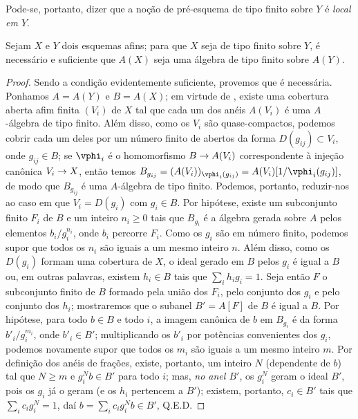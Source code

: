 \documentclass[oneside]{amsart}
\makeatletter
\renewcommand{\geq}{\geqslant}
\newcommand{\ega@arrow}[2]{\mathchoice{#1}{#2}{#2}{#2}}
\renewcommand{\to}{\ega@arrow{\longrightarrow}{\rightarrow}}
\newcommand{\oldpage}[2][]{{\marginnote{\normalfont\textbf{#1}~|~#2}}\ignorespaces}
\let\EGAOriginalLabel\label
\renewcommand{\label}[1]{\phantomsection\EGAOriginalLabel{#1}}
\makeatother
\begin{document}
\oldpage[I]{145}
Pode-se, portanto, dizer que a noção de pré-esquema de tipo finito sobre $Y$ é \emph{local em $Y$}.

\begin{proposition}[6.3.3]
\label{I.6.3.3}
Sejam $X$ e $Y$ dois esquemas afins;
para que $X$ seja de tipo finito sobre $Y$, é necessário e suficiente que $A(X)$ seja uma álgebra de tipo finito sobre $A(Y)$.
\end{proposition}

\begin{proof}
Sendo a condição evidentemente suficiente, provemos que é necessária.
Ponhamos $A=A(Y)$ e $B=A(X)$;
em virtude de , existe uma cobertura aberta afim finita $(V_i)$ de $X$ tal que cada um dos anéis $A(V_i)$ é uma $A$-álgebra de tipo finito.
Além disso, como os $V_i$ são quase-compactos, podemos cobrir cada um deles por um número finito de abertos da forma $D(g_{ij})\subset V_i$, onde $g_{ij}\in B$;
se $\vphi_i$ é o homomorfismo $B\to A(V_i)$ correspondente à injeção canônica $V_i\to X$, então temos $B_{g_{ij}}=(A(V_i))_{\vphi_i(g_{ij})}=A(V_i)[1/\vphi_i(g_{ij})]$, de modo que $B_{g_{ij}}$ é uma $A$-álgebra de tipo finito.
Podemos, portanto, reduzir-nos ao caso em que $V_i=D(g_i)$ com $g_i\in B$.
Por hipótese, existe um subconjunto finito $F_i$ de $B$ e um inteiro $n_i\geq0$ tais que $B_{g_i}$ é a álgebra gerada sobre $A$ pelos elementos $b_i/g_i^{n_i}$, onde $b_i$ percorre $F_i$.
Como os $g_i$ são em número finito, podemos supor que todos os $n_i$ são iguais a um mesmo inteiro $n$.
Além disso, como os $D(g_i)$ formam uma cobertura de $X$, o ideal gerado em $B$ pelos $g_i$ é igual a $B$ ou, em outras palavras, existem $h_i\in B$ tais que $\sum_i h_ig_i=1$.
Seja então $F$ o subconjunto finito de $B$ formado pela união dos $F_i$, pelo conjunto dos $g_i$ e pelo conjunto dos $h_i$; mostraremos que o subanel $B'=A[F]$ de $B$ é igual a $B$.
Por hipótese, para todo $b\in B$ e todo $i$, a imagem canônica de $b$ em $B_{g_i}$ é da forma $b'_i/g_i^{m_i}$, onde $b'_i\in B'$;
multiplicando os $b'_i$ por potências convenientes dos $g_i$, podemos novamente supor que todos os $m_i$ são iguais a um mesmo inteiro $m$.
Por definição dos anéis de frações, existe, portanto, um inteiro $N$ (dependente de $b$) tal que $N\geq m$ e $g_i^Nb\in B'$ para todo $i$;
mas, \emph{no anel $B'$}, os $g_i^N$ geram o ideal $B'$, pois os $g_i$ já o geram (e os $h_i$ pertencem a $B'$);
existem, portanto, $c_i\in B'$ tais que $\sum_i c_ig_i^N=1$, daí $b=\sum_ic_ig_i^Nb\in B'$, Q.E.D.
\end{proof}
\end{document}
